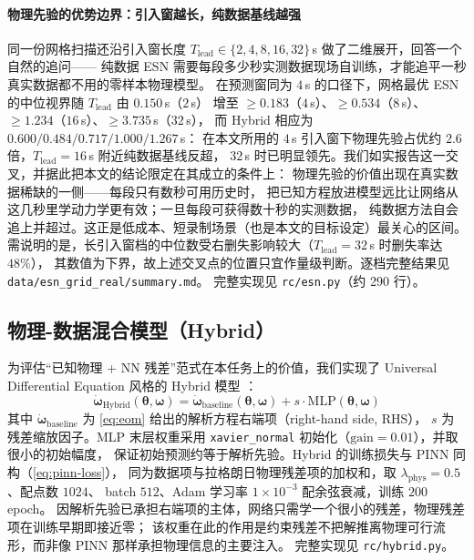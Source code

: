 \documentclass[a4paper,12pt]{ctexart}   %
\let\cite\supercite   %
\renewcommand{\emph}[1]{#1}
\begin{document}
\paragraph{物理先验的优势边界：引入窗越长，纯数据基线越强} 同一份网格扫描还沿引入窗长度
$T_{\mathrm{lead}} \in \{2, 4, 8, 16, 32\}$\,s 做了二维展开，回答一个自然的追问——
纯数据 ESN 需要每段多少秒实测数据现场自训练，才能追平一秒真实数据都不用的零样本物理模型。
在预测窗同为 $4$\,s 的口径下，网格最优 ESN 的中位视界随 $T_{\mathrm{lead}}$ 由 $0.150$\,s（$2$\,s）
增至 $\ge 0.183$（$4$\,s）、$\ge 0.534$（$8$\,s）、$\ge 1.234$（$16$\,s）、$\ge 3.735$\,s（$32$\,s），
而 Hybrid 相应为 $0.600 / 0.484 / 0.717 / 1.000 / 1.267$\,s：
在本文所用的 $4$\,s 引入窗下物理先验占优约 $2.6$ 倍，$T_{\mathrm{lead}} = 16$\,s 附近纯数据基线反超，
$32$\,s 时已明显领先。我们如实报告这一交叉，并据此把本文的结论限定在其成立的条件上：
\emph{物理先验的价值出现在真实数据稀缺的一侧}——每段只有数秒可用历史时，
把已知方程放进模型远比让网络从这几秒里学动力学更有效；一旦每段可获得数十秒的实测数据，
纯数据方法自会追上并超过。这正是低成本、短录制场景（也是本文的目标设定）最关心的区间。
需说明的是，长引入窗档的中位数受右删失影响较大（$T_{\mathrm{lead}} = 32$\,s 时删失率达 $48\%$），
其数值为下界，故上述交叉点的位置只宜作量级判断。逐档完整结果见 \texttt{data/esn\_grid\_real/summary.md}。
完整实现见 \texttt{rc/esn.py}（约 290 行）。

\subsection{物理-数据混合模型（Hybrid）}
\label{sec:hybrid}
为评估“已知物理 + NN 残差”范式在本任务上的价值，我们实现了
Universal Differential Equation 风格的 Hybrid 模型 \cite{rackauckas2020universal}：
\begin{equation}
\dot{\bm{\omega}}_{\mathrm{Hybrid}}(\bm{\theta}, \bm{\omega})
= \dot{\bm{\omega}}_{\mathrm{baseline}}(\bm{\theta}, \bm{\omega}) + s \cdot \mathrm{MLP}(\bm{\theta}, \bm{\omega})
\label{eq:hybrid}
\end{equation}
其中 $\dot{\bm{\omega}}_{\mathrm{baseline}}$ 为 \cref{eq:eom} 给出的解析方程右端项（right-hand side, RHS），
$s$ 为残差缩放因子。MLP 末层权重采用 \texttt{xavier\_normal} 初始化（$\mathrm{gain}=0.01$），并取很小的初始幅度，
保证初始预测约等于解析先验。Hybrid 的训练损失与 PINN 同构（\cref{eq:pinn-loss}），
同为数据项与拉格朗日物理残差项的加权和，取 $\lambda_{\mathrm{phys}} = 0.5$、配点数 $1024$、
batch $512$、Adam 学习率 $1 \times 10^{-3}$ 配余弦衰减，训练 $200$ epoch。
因解析先验已承担右端项的主体，网络只需学一个很小的残差，物理残差项在训练早期即接近零；
该权重在此的作用是约束残差不把解推离物理可行流形，而非像 PINN 那样承担物理信息的主要注入。
完整实现见 \texttt{rc/hybrid.py}。
\end{document}
